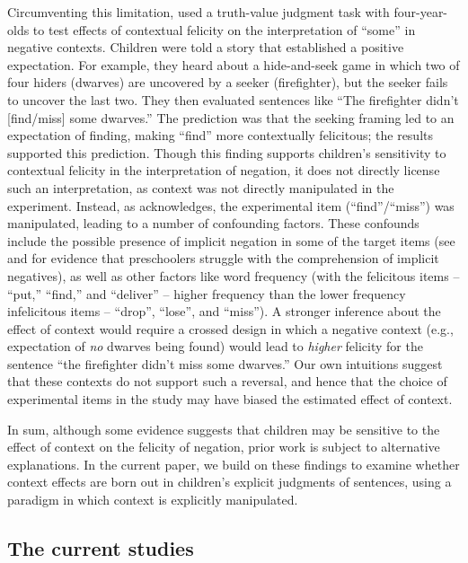 \documentclass[man, noapacite]{apa2}
\begin{document}
Circumventing this limitation,  used a truth-value judgment task with four-year-olds to test effects of contextual felicity on the interpretation of ``some'' in negative contexts. Children were told a story that established a positive expectation. For example, they heard about a hide-and-seek game in which two of four hiders (dwarves) are uncovered by a seeker (firefighter), but the seeker fails to uncover the last two. They then evaluated sentences like ``The firefighter didn't [find/miss] some dwarves.'' The prediction was that the seeking framing led to an expectation of finding, making ``find'' more contextually felicitous; the results supported this prediction. Though this finding supports children's sensitivity to contextual felicity in the interpretation of negation, it does not directly license such an interpretation, as context was not directly manipulated in the experiment. Instead, as  acknowledges, the experimental item (``find''/``miss'') was manipulated, leading to a number of confounding factors. These confounds include the possible presence of implicit negation in some of the target items (see  and  for evidence that preschoolers struggle with the comprehension of implicit negatives), as well as other factors like word frequency (with the felicitous items -- ``put,'' ``find,'' and ``deliver'' -- higher frequency than the lower frequency infelicitous items -- ``drop'', ``lose'', and ``miss''). A stronger inference about the effect of context would require a crossed design in which a negative context (e.g., expectation of \emph{no} dwarves being found) would lead to \emph{higher} felicity for the sentence ``the firefighter didn't miss some dwarves.'' Our own intuitions suggest that these contexts do not support such a reversal, and hence that the choice of experimental items in the study may have biased the estimated effect of context.

In sum, although some evidence suggests that children may be sensitive to the effect of context on the felicity of negation, prior work is subject to alternative explanations. In the current paper, we build on these findings to examine whether context effects are born out in children's explicit judgments of sentences, using a paradigm in which context is explicitly manipulated.

\subsection{The current studies}
\end{document}
